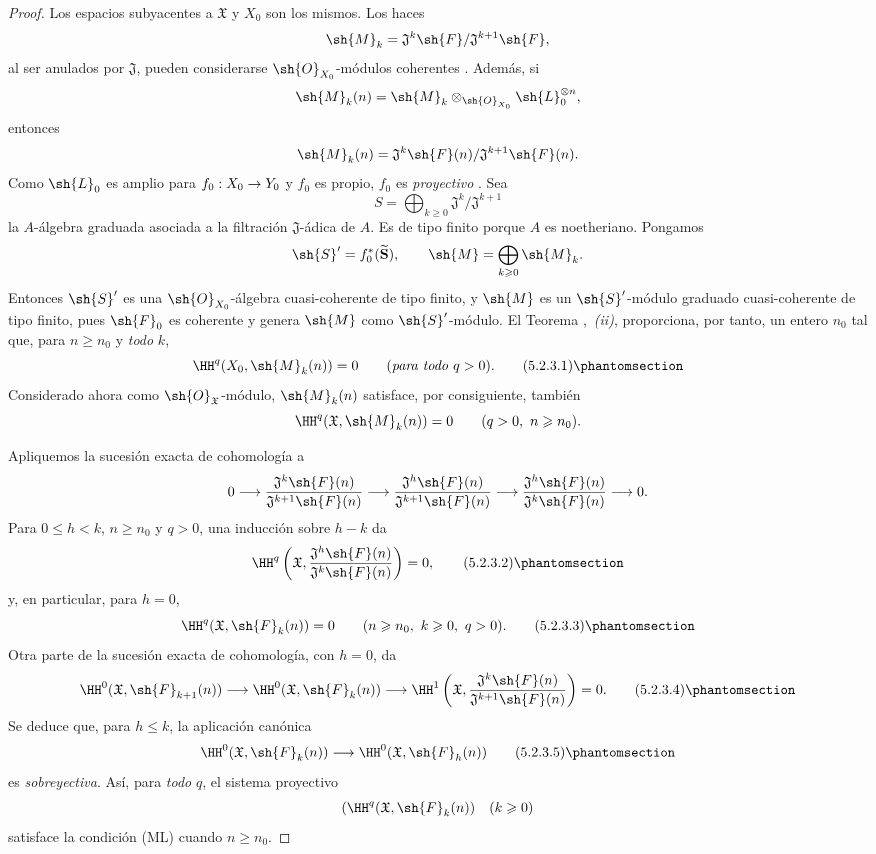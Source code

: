 \documentclass[oneside]{amsart}
\makeatletter
\renewcommand{\leq}{\leqslant}
\renewcommand{\geq}{\geqslant}
\newcommand{\ega@arrow}[2]{\mathchoice{#1}{#2}{#2}{#2}}
\renewcommand{\to}{\ega@arrow{\longrightarrow}{\rightarrow}}
\newcommand{\oldpage}[2][]{{\marginnote{\normalfont\textbf{#1}~|~#2}}\ignorespaces}
\let\EGAOriginalLabel\label
\renewcommand{\label}[1]{\phantomsection\EGAOriginalLabel{#1}}
\makeatother
\begin{document}
\begin{proof}
Los espacios subyacentes a $\mathfrak{X}$ y $X_0$ son los mismos.
Los haces
\[
  \sh{M}_k
  =
  \mathfrak{J}^k\sh{F}/\mathfrak{J}^{k+1}\sh{F},
\]
al ser anulados por $\mathfrak{J}$, pueden considerarse
$\sh{O}_{X_0}$-módulos coherentes . Además, si
\[
  \sh{M}_k(n)
  =
  \sh{M}_k\otimes_{\sh{O}_{X_0}}\sh{L}_0^{\otimes n},
\]
entonces
\[
  \sh{M}_k(n)
  =
  \mathfrak{J}^k\sh{F}(n)/
  \mathfrak{J}^{k+1}\sh{F}(n).
\]
Como $\sh{L}_0$ es amplio para $f_0:X_0\to Y_0$ y $f_0$ es
propio,
\oldpage[III]{152}
$f_0$ es \emph{proyectivo} . Sea
\[
  S=\bigoplus_{k\geq0}
  \mathfrak{J}^k/\mathfrak{J}^{k+1}
\]
la $A$-álgebra graduada asociada a la
filtración $\mathfrak{J}$-ádica de $A$. Es de tipo finito
porque $A$ es noetheriano. Pongamos
\[
  \sh{S}'=f_0^*(\widetilde{\mathbf S}),\qquad
  \sh{M}=\bigoplus_{k\geq0}\sh{M}_k.
\]
Entonces $\sh{S}'$ es una $\sh{O}_{X_0}$-álgebra cuasi-coherente de
tipo finito, y $\sh{M}$ es un $\sh{S}'$-módulo graduado
cuasi-coherente de tipo finito, pues $\sh{F}_0$ es coherente y
genera $\sh{M}$ como $\sh{S}'$-módulo. El Teorema
,~\emph{(ii)}, proporciona, por tanto, un entero $n_0$
tal que, para $n\geq n_0$ y \emph{todo} $k$,
\[
  \HH^q(X_0,\sh{M}_k(n))=0
  \qquad(\text{\emph{para todo} }q>0).
  \tag{5.2.3.1}
  \label{III.5.2.3.1}
\]
Considerado ahora como $\sh{O}_{\mathfrak{X}}$-módulo,
$\sh{M}_k(n)$ satisface, por consiguiente, también
\[
  \HH^q(\mathfrak{X},\sh{M}_k(n))=0
  \qquad(q>0,\ n\geq n_0).
\]

Apliquemos la sucesión exacta de cohomología a
\[
  0\longrightarrow
  \frac{\mathfrak{J}^k\sh{F}(n)}
       {\mathfrak{J}^{k+1}\sh{F}(n)}
  \longrightarrow
  \frac{\mathfrak{J}^h\sh{F}(n)}
       {\mathfrak{J}^{k+1}\sh{F}(n)}
  \longrightarrow
  \frac{\mathfrak{J}^h\sh{F}(n)}
       {\mathfrak{J}^{k}\sh{F}(n)}
  \longrightarrow0.
\]
Para $0\leq h<k$, $n\geq n_0$ y $q>0$, una inducción sobre $h-k$
da
\[
  \HH^q\left(
    \mathfrak{X},
    \frac{\mathfrak{J}^h\sh{F}(n)}
         {\mathfrak{J}^{k}\sh{F}(n)}
  \right)=0,
  \tag{5.2.3.2}
  \label{III.5.2.3.2}
\]
y, en particular, para $h=0$,
\[
  \HH^q(\mathfrak{X},\sh{F}_k(n))=0
  \qquad(n\geq n_0,\ k\geq0,\ q>0).
  \tag{5.2.3.3}
  \label{III.5.2.3.3}
\]
Otra parte de la sucesión exacta de cohomología, con $h=0$, da
\[
  \HH^0(\mathfrak{X},\sh{F}_{k+1}(n))
  \longrightarrow
  \HH^0(\mathfrak{X},\sh{F}_k(n))
  \longrightarrow
  \HH^1\left(
    \mathfrak{X},
    \frac{\mathfrak{J}^k\sh{F}(n)}
         {\mathfrak{J}^{k+1}\sh{F}(n)}
  \right)
  =0.
  \tag{5.2.3.4}
  \label{III.5.2.3.4}
\]
Se deduce que, para $h\leq k$, la aplicación canónica
\[
  \HH^0(\mathfrak{X},\sh{F}_k(n))
  \longrightarrow
  \HH^0(\mathfrak{X},\sh{F}_h(n))
  \tag{5.2.3.5}
  \label{III.5.2.3.5}
\]
es \emph{sobreyectiva}. Así, para \emph{todo} $q$, el sistema proyectivo
\[
  (\HH^q(\mathfrak{X},\sh{F}_k(n))\quad(k\geq0)
\]
satisface la condición (ML) cuando $n\geq n_0$.


\end{proof}
\end{document}
